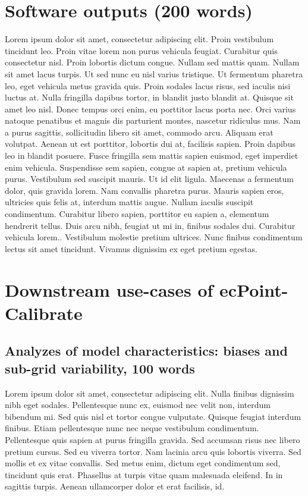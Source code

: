 \documentclass[techmemo]{ecmwfrep}%
\begin{document}
\section{Software outputs (200 words)}
Lorem ipsum dolor sit amet, consectetur adipiscing elit. Proin vestibulum tincidunt leo. Proin vitae lorem non purus vehicula feugiat. Curabitur quis consectetur nisl. Proin lobortis dictum congue. Nullam sed mattis quam. Nullam sit amet lacus turpis. Ut sed nunc eu nisl varius tristique. Ut fermentum pharetra leo, eget vehicula metus gravida quis. Proin sodales lacus risus, sed iaculis nisi luctus at. Nulla fringilla dapibus tortor, in blandit justo blandit at. Quisque sit amet leo nisl. Donec tempus orci enim, eu porttitor lacus porta nec. Orci varius natoque penatibus et magnis dis parturient montes, nascetur ridiculus mus. Nam a purus sagittis, sollicitudin libero sit amet, commodo arcu. Aliquam erat volutpat. Aenean ut est porttitor, lobortis dui at, facilisis sapien. Proin dapibus leo in blandit posuere. Fusce fringilla sem mattis sapien euismod, eget imperdiet enim vehicula. Suspendisse sem sapien, congue at sapien at, pretium vehicula purus. Vestibulum sed suscipit mauris. Ut id elit ligula. Maecenas a fermentum dolor, quis gravida lorem. Nam convallis pharetra purus. Mauris sapien eros, ultricies quis felis at, interdum mattis augue. Nullam iaculis suscipit condimentum. Curabitur libero sapien, porttitor eu sapien a, elementum hendrerit tellus. Duis arcu nibh, feugiat ut mi in, finibus sodales dui. Curabitur vehicula lorem.. Vestibulum molestie pretium ultrices. Nunc finibus condimentum lectus sit amet tincidunt. Vivamus dignissim ex eget pretium egestas.

\section{Downstream use-cases of ecPoint-Calibrate}
\subsection{Analyzes of model characteristics: biases and sub-grid variability, 100 words}
Lorem ipsum dolor sit amet, consectetur adipiscing elit. Nulla finibus dignissim nibh eget sodales. Pellentesque nunc ex, euismod nec velit non, interdum bibendum mi. Sed quis nisl et tortor congue vulputate. Quisque feugiat interdum finibus. Etiam pellentesque nunc nec neque vestibulum condimentum. Pellentesque quis sapien at purus fringilla gravida. Sed accumsan risus nec libero pretium cursus. Sed eu viverra tortor. Nam lacinia arcu quis lobortis viverra. Sed mollis et ex vitae convallis. Sed metus enim, dictum eget condimentum sed, tincidunt quis erat. Phasellus at turpis vitae quam malesuada eleifend. In in sagittis turpis. Aenean ullamcorper dolor et erat facilisis, id.
\end{document}
